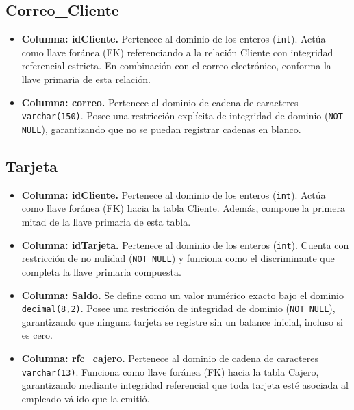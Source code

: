 \documentclass[11pt,letterpaper,spanish]{article}
\begin{document}
\subsection*{Correo\_Cliente}
\begin{itemize}
	\item \textbf{Columna: idCliente.} Pertenece al dominio de los enteros (\texttt{int}). Actúa como llave foránea (FK) referenciando a la relación Cliente con integridad referencial estricta. En combinación con el correo electrónico, conforma la llave primaria de esta relación.
	\item \textbf{Columna: correo.} Pertenece al dominio de cadena de caracteres \texttt{varchar(150)}. Posee una restricción explícita de integridad de dominio (\texttt{NOT NULL}), garantizando que no se puedan registrar cadenas en blanco.
\end{itemize}

\subsection*{Tarjeta}
\begin{itemize}
	\item \textbf{Columna: idCliente.} Pertenece al dominio de los enteros (\texttt{int}). Actúa como llave foránea (FK) hacia la tabla Cliente. Además, compone la primera mitad de la llave primaria de esta tabla.
	\item \textbf{Columna: idTarjeta.} Pertenece al dominio de los enteros (\texttt{int}). Cuenta con restricción de no nulidad (\texttt{NOT NULL}) y funciona como el discriminante que completa la llave primaria compuesta.
	\item \textbf{Columna: Saldo.} Se define como un valor numérico exacto bajo el dominio \texttt{decimal(8,2)}. Posee una restricción de integridad de dominio (\texttt{NOT NULL}), garantizando que ninguna tarjeta se registre sin un balance inicial, incluso si es cero.
	\item \textbf{Columna: rfc\_cajero.} Pertenece al dominio de cadena de caracteres \texttt{varchar(13)}. Funciona como llave foránea (FK) hacia la tabla Cajero, garantizando mediante integridad referencial que toda tarjeta esté asociada al empleado válido que la emitió.
\end{itemize}
\end{document}
